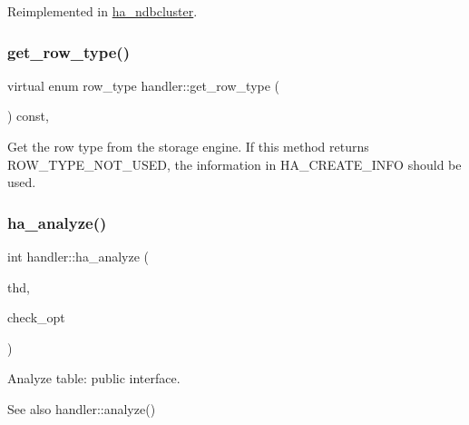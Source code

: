 Reimplemented in \mbox{\hyperlink{classha__ndbcluster_a8ef2926a38b2b39387ad40c55708faa2}{ha\+\_\+ndbcluster}}.

\mbox{\label{classhandler_a163a360c0cd4575ae207553b8d5c918d}} 
\subsubsection{\texorpdfstring{get\+\_\+row\+\_\+type()}{get\_row\_type()}}
{\footnotesize\ttfamily virtual enum row\+\_\+type handler\+::get\+\_\+row\+\_\+type (\begin{DoxyParamCaption}{ }\end{DoxyParamCaption}) const\hspace{0.3cm}{\ttfamily [inline]}, {\ttfamily [virtual]}}

Get the row type from the storage engine. If this method returns R\+O\+W\+\_\+\+T\+Y\+P\+E\+\_\+\+N\+O\+T\+\_\+\+U\+S\+ED, the information in H\+A\+\_\+\+C\+R\+E\+A\+T\+E\+\_\+\+I\+N\+FO should be used. \mbox{\label{classhandler_a66cc9e4971b8e768c102398da0656a7f}} 
\subsubsection{\texorpdfstring{ha\+\_\+analyze()}{ha\_analyze()}}
{\footnotesize\ttfamily int handler\+::ha\+\_\+analyze (\begin{DoxyParamCaption}\item[{T\+HD $\ast$}]{thd,  }\item[{\mbox{\hyperlink{structst__ha__check__opt}{H\+A\+\_\+\+C\+H\+E\+C\+K\+\_\+\+O\+PT}} $\ast$}]{check\+\_\+opt }\end{DoxyParamCaption})}

Analyze table\+: public interface.

\begin{DoxySeeAlso}{See also}
handler\+::analyze() 
\end{DoxySeeAlso}
\mbox{\label{classhandler_a49c8ce82a564b0cbf6340dc9b74a9c23}} 
